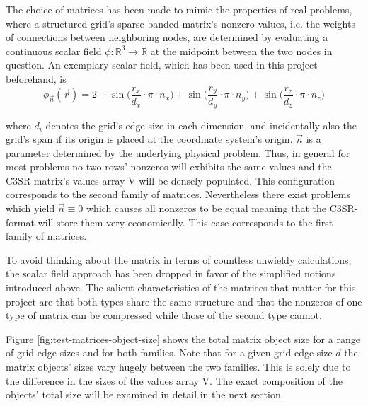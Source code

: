     The choice of matrices has been made to mimic the properties of real problems, where a structured grid's sparse
    banded matrix's nonzero values, i.e. the weights of connections between neighboring nodes, are determined by
    evaluating a continuous scalar field $\phi: \mathbb{R}^3 \rightarrow \mathbb{R}$ at the midpoint between the two
    nodes in question. An exemplary scalar field, which has been used in this project beforehand, is
    $$
    \phi_{\vec{n}}(\vec{r}) = 2+
      \sin\bigg(\frac{r_x}{d_x}\cdot \pi \cdot n_x \bigg)+
      \sin\bigg(\frac{r_y}{d_y}\cdot \pi \cdot n_y \bigg)+
      \sin\bigg(\frac{r_z}{d_z}\cdot \pi \cdot n_z \bigg)
    $$

    where $d_i$ denotes the grid's edge size in each dimension, and incidentally also the grid's span if its origin is
    placed at the coordinate system's origin. $\vec{n}$ is a parameter determined by the underlying physical problem.
    Thus, in general for most problems no two rows' nonzeros will exhibits the same values and the C3SR-matrix's values
    array V will be densely populated. This configuration corresponds to the second family of matrices. Nevertheless
    there exist problems which yield $\vec{n} \equiv 0$ which causes all nonzeros to be equal meaning that the
    C3SR-format will store them very economically. This case corresponds to the first family of matrices.

    To avoid thinking about the matrix in terms of countless unwieldy calculations, the scalar field approach has been
    dropped in favor of the simplified notions introduced above. The salient characteristics of the matrices that matter
    for this project are that both types share the same structure and that the nonzeros of one type of matrix can be
    compressed while those of the second type cannot.

    Figure \ref{fig:test-matrices-object-size} shows the total matrix object size for a range of grid edge sizes and for
    both families. Note that for a given grid edge size $d$ the matrix objects' sizes vary hugely between the two
    families. This is solely due to the difference in the sizes of the values array V. The exact composition of the
    objects' total size will be examined in detail in the next section.


